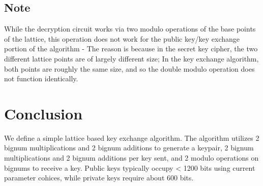 \documentclass[preprint]{iacrtrans}
\begin{document}
\subsection{Note}
While the decryption circuit works via two modulo operations of the base points of the lattice, this operation does not work for the public key/key exchange portion of the algorithm - The reason is because in the secret key cipher, the two different lattice points are of largely different size; In the key exchange algorithm, both points are roughly the same size, and so the double modulo operation does not function identically.

\section{Conclusion}
 We define a simple lattice based key exchange algorithm. The algorithm utilizes 2 bignum multiplications and 2 bignum additions to generate a keypair, 2 bignum multiplications and 2 bignum additions per key sent, and 2 modulo operations on bignums to receive a key. Public keys typically occupy < 1200 bits using current parameter cohices, while private keys require about 600 bits.
\end{document}
